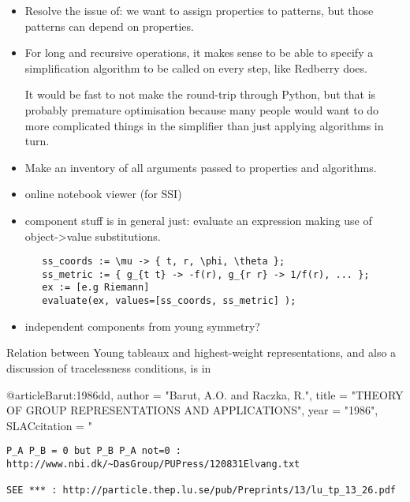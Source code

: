 \documentclass[11pt]{article}
\begin{document}
\begin{itemize}
\item Resolve the issue of: we want to assign properties to patterns, but those patterns can 
depend on properties.

\item For long and recursive operations, it makes sense to be able to specify a simplification
algorithm to be called on every step, like Redberry does.

%      
% 
  
It would be fast to not make the round-trip through Python, but that
is probably premature optimisation because many people would want to
do more complicated things in the simplifier than just applying
algorithms in turn.

\item Make an inventory of all arguments passed to properties and algorithms.

\item online notebook viewer (for SSI)

\item component stuff is in general just: evaluate an expression
  making use of object->value substitutions. 

\begin{verbatim}
   ss_coords := \mu -> { t, r, \phi, \theta };
   ss_metric := { g_{t t} -> -f(r), g_{r r} -> 1/f(r), ... };
   ex := [e.g Riemann]
   evaluate(ex, values=[ss_coords, ss_metric] );
\end{verbatim}

\item independent components from young symmetry?

\end{itemize}


Relation between Young tableaux and highest-weight representations,
and also a discussion of tracelessness conditions, is in 

@article{Barut:1986dd,
      author         = "Barut, A.O. and Raczka, R.",
      title          = "{THEORY OF GROUP REPRESENTATIONS AND APPLICATIONS}",
      year           = "1986",
      SLACcitation   = "%
}

\begin{verbatim}
P_A P_B = 0 but P_B P_A not=0 :
http://www.nbi.dk/~DasGroup/PUPress/120831Elvang.txt

SEE *** : http://particle.thep.lu.se/pub/Preprints/13/lu_tp_13_26.pdf
\end{verbatim}
\end{document}
